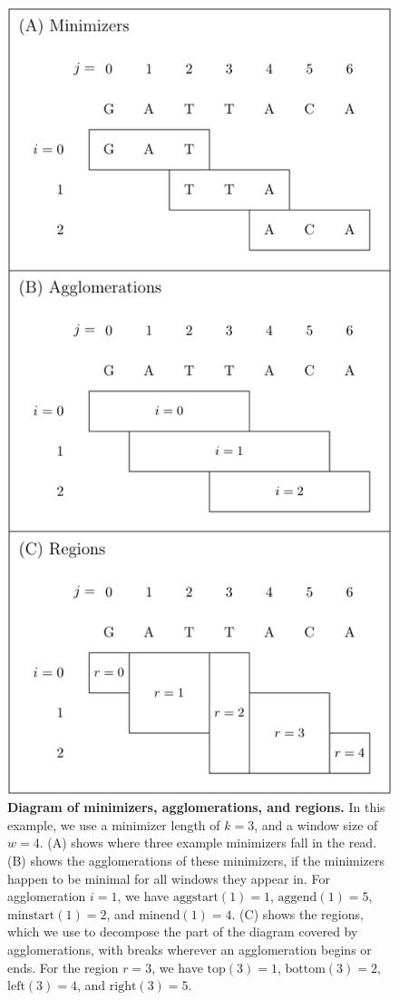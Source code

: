 \documentclass[11pt]{ucscthesis}
\newcommand{\rtop}[1]{\mathrm{top}(#1)}
\newcommand{\rbottom}[1]{\mathrm{bottom}(#1)}
\newcommand{\rleft}[1]{\mathrm{left}(#1)}
\newcommand{\rright}[1]{\mathrm{right}(#1)}
\newcommand{\minstart}[1]{\mathrm{minstart}(#1)}
\newcommand{\minend}[1]{\mathrm{minend}(#1)}
\newcommand{\aggstart}[1]{\mathrm{aggstart}(#1)}
\newcommand{\aggend}[1]{\mathrm{aggend}(#1)}
\begin{document}
\begin{figure}[H]
    \includegraphics[width=.5\linewidth]{aim2_supplement_regiondiagram.pdf}
    \caption[Diagram of minimizers, agglomerations, and regions]{{\bf Diagram of minimizers, agglomerations, and regions.} In this example, we use a minimizer length of $k=3$, and a window size of $w=4$. (A) shows where three example minimizers fall in the read. (B) shows the agglomerations of these minimizers, if the minimizers happen to be minimal for all windows they appear in. For agglomeration $i=1$, we have $\aggstart{1}=1$, $\aggend{1}=5$, $\minstart{1}=2$, and $\minend{1}=4$. (C) shows the regions, which we use to decompose the part of the diagram covered by agglomerations, with breaks wherever an agglomeration begins or ends. For the region $r=3$, we have $\rtop{3}=1$, $\rbottom{3}=2$, $\rleft{3}=4$, and $\rright{3}=5$.
  }
  \label{fig:aim2_supplement_regions}
\end{figure}
\end{document}
